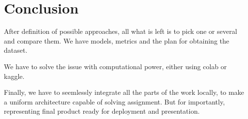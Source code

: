 \section{Conclusion}

After definition of possible approaches, all what is left is to pick one or
several and compare them. We have models, metrics and the plan for obtaining
the dataset.

We have to solve the issue with computational power, either using colab or
kaggle.

Finally, we have to seemlessly integrate all the parts of the work locally, to
make a uniform architecture capable of solving assignment. But for importantly,
representing final product ready for deployment and presentation.
